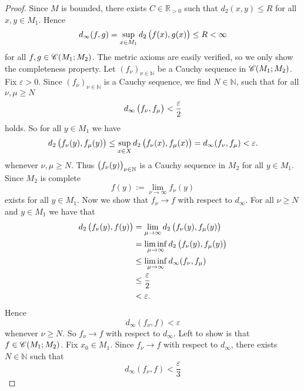 \begin{proof}
Since $M$ is bounded, there exists $C \in \mathbb{R}_{>0}$ such that $d_2(x,y) \leq R$ for all $x,y \in M_1$. Hence 
\begin{equation*}
d_\infty(f,g) = \sup_{x \in M_1} d_2\del[1]{f(x),g(x)} \leq R < \infty
\end{equation*}
\noindent for all $f,g \in \mathscr{C}(M_1;M_2)$. The metric axioms are easily verified, so we only show the completeness property. Let $(f_\nu)_{\nu \in \mathbb{N}}$ be a Cauchy sequence in $\mathscr{C}(M_1;M_2)$. Fix $\varepsilon > 0$. Since $(f_\nu)_{\nu \in \mathbb{N}}$ is a Cauchy sequence, we find $N \in \mathbb{N}$, such that for all $\nu,\mu \geq N$
\begin{equation*}
d_\infty\del[1]{f_\nu,f_\mu} < \frac{\varepsilon}{2} 
\end{equation*}
\noindent holds. So for all $y \in M_1$ we have 
\begin{equation*}
d_2\del[1]{f_\nu(y),f_\mu(y)} \leq \sup_{x \in X}d_2\del[1]{f_\nu(x),f_\mu(x)} = d_\infty(f_\nu,f_\mu) < \varepsilon.
\end{equation*}
\noindent whenever $\nu,\mu \geq N$. Thus $\del[1]{f_\nu(y)}_{\nu \in \mathbb{N}}$ is a Cauchy sequence in $M_2$ for all $y \in M_1$. Since $M_2$ is complete 
\begin{equation*}
f(y) := \lim_{\nu \to \infty} f_\nu(y)
\end{equation*}
\noindent exists for all $y \in M_1$. Now we show that $f_\nu \to f$ with respect to $d_\infty$. For all $\nu \geq N$ and $y \in M_1$ we have that 
\begin{align*}
d_2\del[1]{f_\nu(y),f(y)} &= \lim_{\mu \to \infty}d_2\del[1]{f_\nu(y),f_\mu(y)}\\
&= \liminf_{\mu \to \infty}d_2\del[1]{f_\nu(y),f_\mu(y)}\\
&\leq \liminf_{\mu \to \infty}d_\infty(f_\nu,f_\mu)\\
&\leq \frac{\varepsilon}{2}\\
&< \varepsilon.
\end{align*}
Hence 
\begin{equation*}
d_\infty(f_\nu,f) < \varepsilon
\end{equation*}
\noindent whenever $\nu \geq N$. So $f_\nu \to f$ with respect to $d_\infty$. Left to show is that $f \in \mathscr{C}(M_1;M_2)$. Fix $x_0 \in M_1$. Since $f_\nu \to f$ with respect to $d_\infty$, there exists $N \in \mathbb{N}$ such that 
\begin{equation*}
d_\infty(f_\nu,f) < \frac{\varepsilon}{3}

\end{equation*}
\end{proof}
